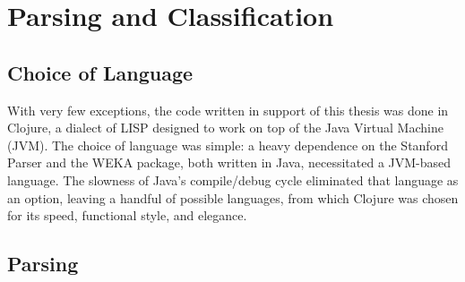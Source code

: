 \documentclass[main.tex]{subfiles}
\begin{document}
\section{Parsing and Classification}
\setcounter{section}{4}
\setcounter{table}{0}
\setcounter{figure}{0}
\subsection{Choice of Language}

With very few exceptions, the code written in support of this thesis was done in Clojure, a dialect of LISP designed to work on top of the Java Virtual Machine (JVM). The choice of language was simple: a heavy dependence on the Stanford Parser and the WEKA package, both written in Java, necessitated a JVM-based language. The slowness of Java's compile/debug cycle eliminated that language as an option, leaving a handful of possible languages, from which Clojure was chosen for its speed, functional style, and elegance.

\subsection{Parsing}
\label{subsec:parsing}
\end{document}
